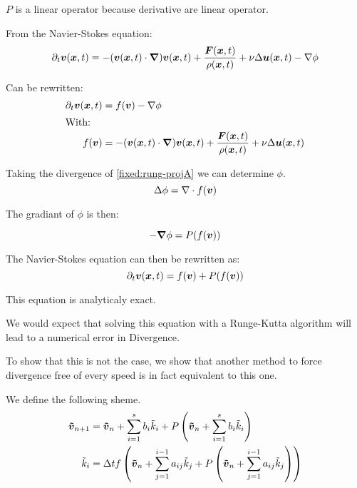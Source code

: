  $P$ is a linear operator because derivative are linear operator.
 
 From the Navier-Stokes equation:
 \begin{equation}
   \partial_t {\boldsymbol {v}}({\boldsymbol {x}} ,t)=-({\boldsymbol {v}}({\boldsymbol {x}},t)\cdot{\boldsymbol {\nabla}} ) {\boldsymbol {v}}({\boldsymbol {x}} ,t)+\frac{{\boldsymbol {F}}({\boldsymbol {x}},t)}{\rho({\boldsymbol {x}},t)}+\nu \Delta {\boldsymbol {u}}({\boldsymbol {x}},t)-\nabla \phi
 \end{equation}

 Can be rewritten:
 \begin{align}
 \label{fixed:rung-projA}
  \partial_t {\boldsymbol {v}}({\boldsymbol {x}} ,t)&=f({\boldsymbol {v}})-\nabla \phi \\
  \intertext{With:}
  f({\boldsymbol {v}})&=-({\boldsymbol {v}}({\boldsymbol {x}},t)\cdot{\boldsymbol {\nabla}} ) {\boldsymbol {v}}({\boldsymbol {x}} ,t)+\frac{{\boldsymbol {F}}({\boldsymbol {x}},t)}{\rho({\boldsymbol {x}},t)}+\nu \Delta {\boldsymbol {u}}({\boldsymbol {x}},t)
 \end{align}
 
 Taking the divergence of \ref{fixed:rung-projA} we can determine $\phi$.
 \begin{equation}
  \Delta \phi=\nabla \cdot f({\boldsymbol {v}})
 \end{equation}

 The gradiant of $\phi$ is then:
 
 \begin{equation}
  -{\boldsymbol {\nabla}}\phi=P(f({\boldsymbol {v}}))
 \end{equation}

 The Navier-Stokes equation can then be rewritten as:
 \begin{equation}\label{fixed:simpl_navier}
 \partial_t {\boldsymbol {v}}({\boldsymbol {x}} ,t)=f({\boldsymbol {v}})+P(f({\boldsymbol {v}})) 
\end{equation}

This equation is analyticaly exact.

We would expect that solving this equation with a Runge-Kutta algorithm will lead to a numerical error in Divergence.

To show that this is not the case, we show that another method to force divergence free of every speed is in fact equivalent to this one.

We define the following sheme.
\begin{align}
{\boldsymbol {\tilde{v}}}_{n+1}&={\boldsymbol {\tilde{v}}}_{n}+\sum_{i=1}^{s}b_{i}\tilde{k}_{i}+P\left({\boldsymbol {\tilde{v}}}_{n}+\sum_{i=1}^{s}b_{i}\tilde{k}_{i}\right)\\
\tilde{k}_{i}&=\Delta t f\left({\boldsymbol {\tilde{v}}}_{n}+\sum_{j=1}^{i-1}a_{ij}\tilde{k}_{j}+P\left({\boldsymbol {\tilde{v}}}_{n}+\sum_{j=1}^{i-1}a_{ij}\tilde{k}_{j}\right)\right)
\end{align}


